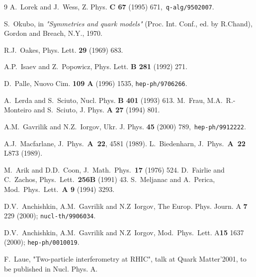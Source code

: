 \documentclass[twoside]{article}
\begin{document}
\begin{thebibliography}{9}
 A.~Lorek and J.~Wess,
        Z. Phys. {\bf C 67} (1995) 671,\ {\tt q-alg/9502007}.

 S.~Okubo, in {\sl "Symmetries and quark models"}
(Proc. Int. Conf., ed. by R.Chand), Gordon and Breach, N.Y., 1970.

 R.J.~Oakes, Phys. Lett. {\bf 29} (1969) 683.

 A.P.~Isaev and Z.~Popowicz, Phys. Lett.
       {\bf B 281} (1992) 271.

 D.~Palle, Nuovo Cim. {\bf 109 A} (1996) 1535,
        {\tt hep-ph/9706266}.

 A.~Lerda and S.~Sciuto,
         Nucl. Phys. {\bf B 401} (1993) 613.
M.~Frau, M.A.~R.-Monteiro and S.~Sciuto, J. Phys. {\bf A 27} (1994) 801.

 A.M.~Gavrilik and N.Z.~Iorgov,
        Ukr. J. Phys. {\bf 45} (2000) 789,\ {\tt hep-ph/9912222}.

A.J.~Macfarlane,  J.\ Phys.\ {\bf A\ 22}, 4581 (1989).
L.~Biedenharn, J.\ Phys.\ {\bf A\ 22} L873 (1989).

M.~Arik and D.D.~Coon, J.\ Math.\ Phys.\ {\bf 17} (1976) 524.
D.~Fairlie and C.~Zachos, Phys.\ Lett.\ {\bf 256B} (1991) 43.
S.~Meljanac and A.~Perica,
Mod.\ Phys.\ Lett.\ {\bf A 9} (1994) 3293.

 D.V.~Anchishkin, A.M.~Gavrilik and N.Z~Iorgov,
 The Europ. Phys. Journ. A {\bf 7} 229 (2000); {\tt nucl-th/9906034}.

 D.V.~Anchishkin, A.M.~Gavrilik and N.Z~Iorgov,
  Mod.~Phys.~Lett. A{\bf 15} 1637 (2000); {\tt hep-ph/0010019}.

 F.~Laue, "Two-particle interferometry at RHIC", 
talk at Quark Matter'2001, to be published in Nucl. Phys. A. 

\end{thebibliography}
\end{document}
